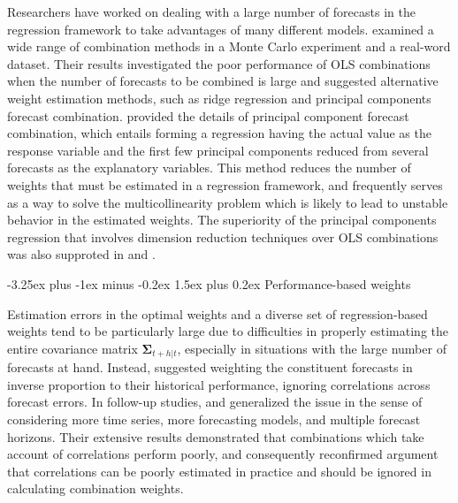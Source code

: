 \documentclass[11pt]{article}
\makeatletter
\renewcommand{\paragraph}{\@startsection{paragraph}{4}{0ex}%
   {-3.25ex plus -1ex minus -0.2ex}%
   {1.5ex plus 0.2ex}%
   {\normalfont\normalsize\bfseries}}
\makeatother
\begin{document}
Researchers have worked on dealing with a large number of forecasts in the regression framework to take advantages of many different models. \cite{Chan1999-io} examined a wide range of combination methods in a Monte Carlo experiment and a real-word dataset. Their results investigated the poor performance of OLS combinations when the number of forecasts to be combined is large and suggested alternative weight estimation methods, such as ridge regression and principal components forecast combination. \cite{Stock2004-rq} provided the details of principal component forecast combination, which entails forming a regression having the actual value as the response variable and the first few principal components reduced from several forecasts as the explanatory variables. This method reduces the number of weights that must be estimated in a regression framework, and frequently serves as a way to solve the multicollinearity problem which is likely to lead to unstable behavior in the estimated weights. The superiority of the principal components regression that involves dimension reduction techniques over OLS combinations was also supproted in \cite{Rapach2008-jh} and \cite{Poncela2011-vz}.

\paragraph{Performance-based weights}

Estimation errors in the optimal weights and a diverse set of regression-based weights tend to be particularly large due to difficulties in properly estimating the entire covariance matrix $\boldsymbol{\Sigma}_{t+h|t}$, especially in situations with the large number of forecasts at hand. Instead, \cite{Bates1969-yj} suggested weighting the constituent forecasts in inverse proportion to their historical performance, ignoring correlations across forecast errors. In follow-up studies, \cite{Newbold1974-lp} and \cite{Winkler1983-ra} generalized the issue in the sense of considering more time series, more forecasting models, and multiple forecast horizons. Their extensive results demonstrated that combinations  which take account of correlations perform poorly, and consequently reconfirmed \cite{Bates1969-yj} argument that correlations can be poorly estimated in practice and should be ignored in calculating combination weights.
\end{document}
